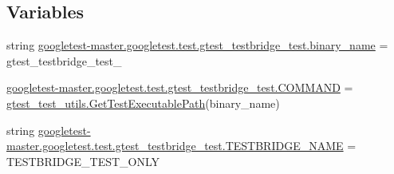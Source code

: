 \subsection*{Variables}
\begin{DoxyCompactItemize}
\item 
string \mbox{\hyperlink{namespacegoogletest-master_1_1googletest_1_1test_1_1gtest__testbridge__test_a61d45a2f7d0ff15c80eca60d04ea0272}{googletest-\/master.\+googletest.\+test.\+gtest\+\_\+testbridge\+\_\+test.\+binary\+\_\+name}} = \textquotesingle{}gtest\+\_\+testbridge\+\_\+test\+\_\+\textquotesingle{}
\item 
\mbox{\hyperlink{namespacegoogletest-master_1_1googletest_1_1test_1_1gtest__testbridge__test_a8197724a49cb0ae372738cbd15b321f9}{googletest-\/master.\+googletest.\+test.\+gtest\+\_\+testbridge\+\_\+test.\+C\+O\+M\+M\+A\+ND}} = \mbox{\hyperlink{namespacegtest__test__utils_a89ed3717984a80ffbb7a9c92f71b86a2}{gtest\+\_\+test\+\_\+utils.\+Get\+Test\+Executable\+Path}}(binary\+\_\+name)
\item 
string \mbox{\hyperlink{namespacegoogletest-master_1_1googletest_1_1test_1_1gtest__testbridge__test_a5d62a403331d71892d7e0952513fe6ed}{googletest-\/master.\+googletest.\+test.\+gtest\+\_\+testbridge\+\_\+test.\+T\+E\+S\+T\+B\+R\+I\+D\+G\+E\+\_\+\+N\+A\+ME}} = \textquotesingle{}T\+E\+S\+T\+B\+R\+I\+D\+G\+E\+\_\+\+T\+E\+S\+T\+\_\+\+O\+N\+LY\textquotesingle{}
\end{DoxyCompactItemize}
